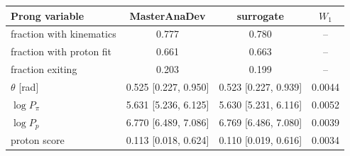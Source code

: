 \begin{tabular}{lccc}
\toprule
Prong variable & MasterAnaDev & surrogate & $W_1$ \\
\midrule
fraction with kinematics & 0.777 & 0.780 & -- \\
fraction with proton fit & 0.661 & 0.663 & -- \\
fraction exiting & 0.203 & 0.199 & -- \\
$\theta$ [rad] & 0.525 [0.227, 0.950] & 0.523 [0.227, 0.939] & 0.0044 \\
$\log P_\pi$ & 5.631 [5.236, 6.125] & 5.630 [5.231, 6.116] & 0.0052 \\
$\log P_p$ & 6.770 [6.489, 7.086] & 6.769 [6.486, 7.080] & 0.0039 \\
proton score & 0.113 [0.018, 0.624] & 0.110 [0.019, 0.616] & 0.0034 \\
\bottomrule
\end{tabular}
